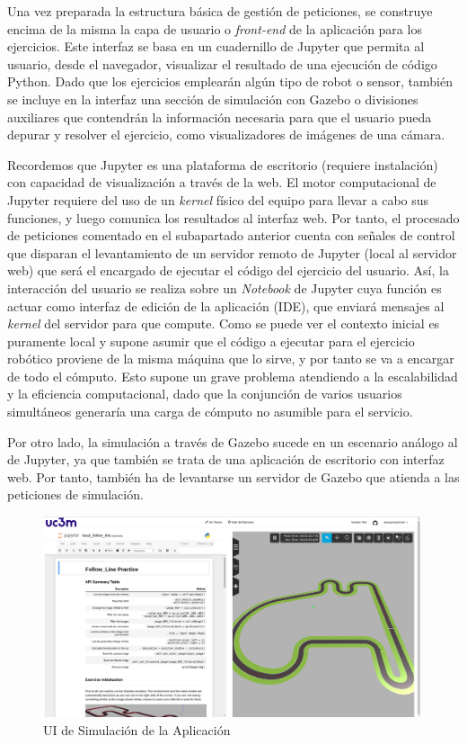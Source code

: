 Una vez preparada la estructura básica de gestión de peticiones, se construye encima de la misma la capa de usuario o \textit{front-end} de la aplicación para los ejercicios. Este interfaz se basa en un cuadernillo de Jupyter que permita al usuario, desde el navegador, visualizar el resultado de una ejecución de código Python. Dado que los ejercicios emplearán algún tipo de robot o sensor, también se incluye en la interfaz una sección de simulación con Gazebo o divisiones auxiliares que contendrán la información necesaria para que el usuario pueda depurar y resolver el ejercicio, como visualizadores de imágenes de una cámara.

Recordemos que Jupyter es una plataforma de escritorio (requiere instalación) con capacidad de visualización a través de la web. El motor computacional de Jupyter requiere del uso de un \textit{kernel} físico del equipo para llevar a cabo sus funciones, y luego comunica los resultados al interfaz web. Por tanto, el procesado de peticiones comentado en el subapartado anterior cuenta con señales de control que disparan el levantamiento de un servidor remoto de Jupyter (local al servidor web) que será el encargado de ejecutar el código del ejercicio del usuario. Así, la interacción del usuario se realiza sobre un \textit{Notebook} de Jupyter cuya función es actuar como interfaz de edición de la aplicación (IDE), que enviará mensajes al \textit{kernel} del servidor para que compute. Como se puede ver el contexto inicial es puramente local y supone asumir que el código a ejecutar para el ejercicio robótico proviene de la misma máquina que lo sirve, y por tanto se va a encargar de todo el cómputo. Esto supone un grave problema atendiendo a la escalabilidad y la eficiencia computacional, dado que la conjunción de varios usuarios simultáneos generaría una carga de cómputo no asumible para el servicio.

Por otro lado, la simulación a través de Gazebo sucede en un escenario análogo al de Jupyter, ya que también se trata de una aplicación de escritorio con interfaz web. Por tanto, también ha de levantarse un servidor de Gazebo que atienda a las peticiones de simulación. 

\begin{figure}[!hbtp]  \centering\noindent
    \includegraphics[width=0.99\textwidth]{figures/ui_simulation.png}
    \caption{UI de Simulación de la Aplicación}
    \label{simui}
\end{figure}

